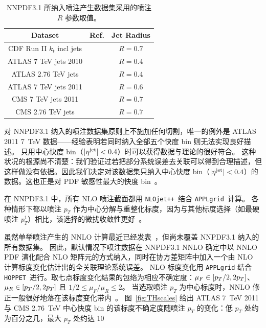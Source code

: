 \begin{table}[H]
\small
\begin{centering}
    \renewcommand{\arraystretch}{1.4}
\begin{tabular}{|c|c|c|}
  \hline
  Dataset  &  Ref.  & Jet Radius \\
  \hline
  \hline
  CDF Run II $k_t$ incl jets & \cite{Abulencia:2007ez} & $R=0.7$
  \tabularnewline
   ATLAS   7 TeV jets 2010 & \cite{Aad:2011fc}  &  $R=0.4$
\tabularnewline
  ATLAS    2.76 TeV jets & \cite{Aad:2013lpa}  & $R=0.4$
\tabularnewline
ATLAS      7 TeV jets 2011   &  \cite{Aad:2014vwa}  & $R=0.6$
\tabularnewline
 CMS   7 TeV jets 2011     & \cite{Chatrchyan:2012bja}&  $R=0.7$
\tabularnewline
 CMS  2.76 TeV jets       & \cite{Khachatryan:2015luy}& $R=0.7$
 \tabularnewline
  \hline
  \end{tabular}
\par\end{centering}
\caption{\small NNPDF3.1 所纳入喷注产生数据集采用的喷注 $R$
  参数取值。
\label{jetRadius}
}
\end{table}

对 NNPDF3.1 纳入的喷注数据集原则上不施加任何切割，唯一的例外是 ATLAS 2011 7~TeV 数据——经验表明若同时纳入全部五个快度 bin 则无法实现良好描述。
%
只用中心快度 bin（$|\eta^{\rm jet}|<0.4$）时可以获得数据与理论的很好符合。
%
这种状况的根源尚不清楚：我们验证过若把部分系统误差去关联可以得到合理描述，但这样做没有依据。因此我们决定对该数据集只纳入中心快度 bin（$|\eta^{\rm jet}|<0.4$）的数据。这也正是对 PDF 敏感性最大的快度 bin~\cite{Rojo:2014kta}。


在 NNPDF3.1 中，所有 NLO 喷注截面都用 {\tt NLOjet++}~\cite{Nagy:2001fj}结合 {\tt APPLgrid}~\cite{Carli:2010rw}计算。
各种情形下都以喷注 $p_T$ 作为中心分解与重整化标度，因为与其他标度选择（如最硬喷注 $p_T^{1}$）相比，该选择的微扰收敛性更好~\cite{Carrazza:2014hra,Currie:2017ctp}。

虽然单举喷注产生的 NNLO 计算最近已经发表~\cite{Currie:2016bfm,Currie:2017ctp}，但尚未覆盖 NNPDF3.1 纳入的所有数据集。
%
因此，默认情况下喷注数据在 NNPDF3.1 NNLO 确定中以 NNLO PDF 演化配合 NLO 矩阵元的方式纳入，同时在协方差矩阵中加入一个由 NLO 计算标度变化估计出的全关联理论系统误差。
%
NLO 标度变化用 {\tt APPLgrid} 结合 {\tt HOPPET}~\cite{Salam:2008qg}进行。取七点标度变化结果的包络为相应不确定度：$\mu_F \in \left[ p_T/2,2p_T\right]$、$\mu_R \in \left[ p_T/2,2p_T\right]$ 且 $1/2 \le \mu_F/\mu_R \le 2$。%
当选取喷注 $p_T$ 为中心标度时，NNLO 修正一般很好地落在该标度变化带内~\cite{Currie:2017ctp}。
图~\ref{fig:THscales} 给出 ATLAS 7~TeV 2011 与 CMS 2.76~TeV 中心快度 bin 的该标度不确定度随喷注 $p_T$ 的变化：低 $p_T$ 处约为百分之几，最大 $p_T$ 处约达 10%


